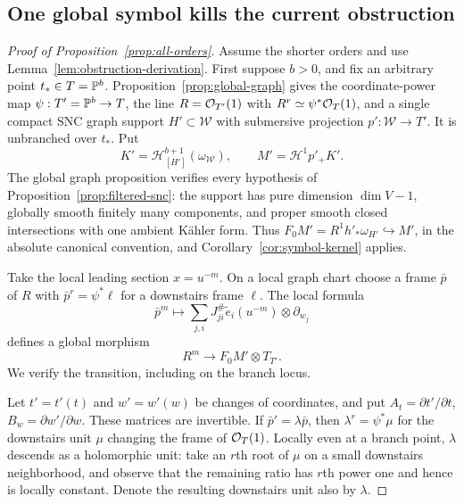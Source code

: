 \subsection{One global symbol kills the current obstruction}

\begin{proof}[Proof of Proposition~\ref{prop:all-orders}]
Assume the shorter orders and use Lemma~\ref{lem:obstruction-derivation}.
First suppose \(b>0\), and fix an arbitrary point \(t_*\in T=\mathbb P^b\).
Proposition~\ref{prop:global-graph} gives the coordinate-power map
\(\psi:T'=\mathbb P^b\to T\), the line \(R=\mathcal O_{T'}(1)\) with
\(R^r\simeq\psi^*\mathcal O_T(1)\), and a single compact SNC graph support
\(H'\subset\mathscr W\) with submersive projection \(p':\mathscr W\to T'\).
It is unbranched over \(t_*\).  Put
\[
 K'=\mathcal H^{b+1}_{[H']}(\omega_{\mathscr W}),\qquad
 M'=\mathcal H^1p'_+K'.
\]
The global graph proposition verifies every hypothesis of
Proposition~\ref{prop:filtered-snc}: the support has pure dimension
\(\dim V-1\), globally smooth finitely many components, and proper
smooth closed intersections with one ambient K\"ahler form.  Thus
\(F_0M'=R^1h'_*\omega_{H'}\hookrightarrow M'\), in the absolute
canonical convention, and Corollary~\ref{cor:symbol-kernel} applies.

Take the local leading section \(x=u^{-m}\).  On a local graph chart
choose a frame \(\bar p\) of \(R\) with \(\bar p^r=\psi^*\ell\) for a
downstairs frame \(\ell\).  The local formula
\begin{equation}\label{eq:global-symbol-local}
 \bar p^m\longmapsto
 \sum_{j,i}J^\#_{ji}\widetilde e_i(u^{-m})\otimes\partial_{w_j}
\end{equation}
defines a global morphism
\begin{equation}\label{eq:global-symbol-map}
 R^m\longrightarrow F_0M'\otimes T_{T'}.
\end{equation}
We verify the transition, including on the branch locus.

Let \(t'=t'(t)\) and \(w'=w'(w)\) be changes of coordinates, and put
\(A_t=\partial t'/\partial t\), \(B_w=\partial w'/\partial w\).  These
matrices are invertible.  If \(\bar p'=\lambda\bar p\), then
\(\lambda^r=\psi^*\mu\) for the downstairs unit \(\mu\) changing the
frame of \(\mathcal O_T(1)\).  Locally even at a branch point, \(\lambda\)
descends as a holomorphic unit: take an \(r\)th root of \(\mu\) on a
small downstairs neighborhood, and observe that the remaining ratio has
\(r\)th power one and hence is locally constant.  Denote the resulting
downstairs unit also by \(\lambda\).


\end{proof}
